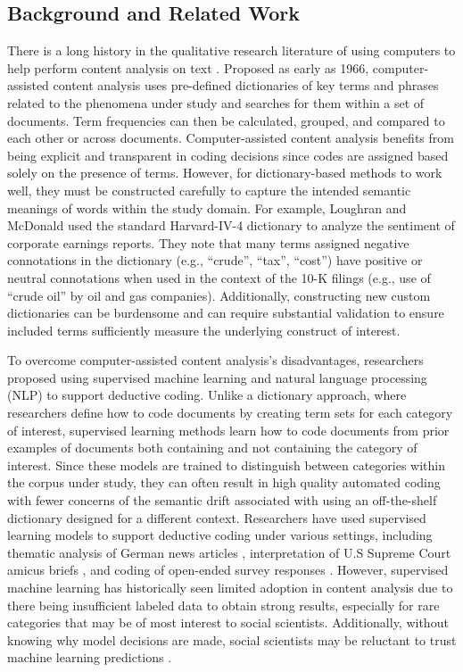 \documentclass{article}
\begin{document}
\subsection{Background and Related Work}
There is a long history in the qualitative research literature of using computers to help perform content analysis on text \cite{weber_computer-aided_1984, roberts2020text}.  Proposed as early as 1966, computer-assisted content analysis \cite{stone_general_1966} uses pre-defined dictionaries of key terms and phrases related to the phenomena under study and searches for them within a set of documents.  Term frequencies can then be calculated, grouped, and compared to each other or across documents.  Computer-assisted content analysis benefits from being explicit and transparent in coding decisions since codes are assigned based solely on the presence of terms.  However, for dictionary-based methods to work well, they must be constructed carefully to capture the intended semantic meanings of words within the study domain. For example, Loughran and McDonald \cite{loughran_when_2011} used the standard Harvard-IV-4 dictionary to analyze the sentiment of corporate earnings reports. They note that many terms assigned negative connotations in the dictionary (e.g., “crude”, “tax”, “cost”) have positive or neutral connotations when used in the context of the 10-K filings (e.g., use of “crude oil” by oil and gas companies).  Additionally, constructing new custom dictionaries can be burdensome and can require substantial validation to ensure included terms sufficiently measure the underlying construct of interest.

To overcome computer-assisted content analysis’s disadvantages, researchers proposed using supervised machine learning and natural language processing (NLP) to support deductive coding. Unlike a dictionary approach, where researchers define how to code documents by creating term sets for each category of interest, supervised learning methods learn how to code documents from prior examples of documents both containing and not containing the category of interest.  Since these models are trained to distinguish between categories within the corpus under study, they can often result in high quality automated coding with fewer concerns of the semantic drift associated with using an off-the-shelf dictionary designed for a different context.  Researchers have used supervised learning models to support deductive coding under various settings, including thematic analysis of German news articles \cite{scharkow_thematic_2013}, interpretation of U.S Supreme Court amicus briefs \cite{evans2007recounting}, and coding of open-ended survey responses \cite{baumgartner_framework_2021}.  However, supervised machine learning has historically seen limited adoption in content analysis due to there being insufficient labeled data to obtain strong results, especially for rare categories that may be of most interest to social scientists. Additionally, without knowing why model decisions are made, social scientists may be reluctant to trust machine learning predictions \cite{chen2016challenges}.
\end{document}
